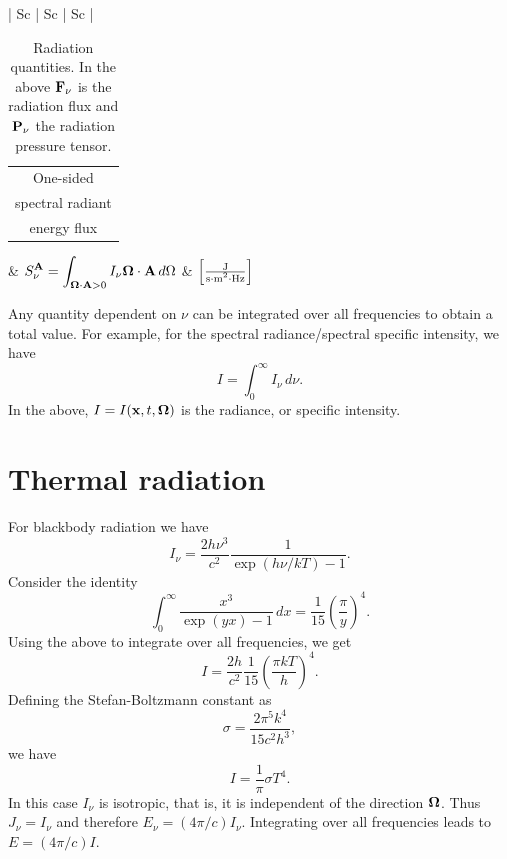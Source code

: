 \documentclass[a4paper,11pt]{article}
\begin{document}
\begin{table}[ht]
\begin{tabular} { | Sc | Sc | Sc |}
        \hline
        
        \begin{tabular}{c} One-sided \\ spectral radiant \\ energy flux \end{tabular} 
        & $ \displaystyle S_\nu^{\mathbf{A}} = \int_{\bm \Omega \cdot \mathbf{A} > 0} I_\nu \bm \Omega \cdot \mathbf{A} \, d\Omega $ 
        & $ \left [ \frac{\text{J}}{\text{s$\cdot$m\textsuperscript{2}$\cdot$Hz}} \right ]$ \\

        \hline
    \end{tabular}
    \caption{Radiation quantities. In the above $\mathbf{F}_\nu$ is the radiation flux and $\mathbf{P}_\nu$ the radiation pressure tensor.}
    \label{tab:definitions}
\end{table}

Any quantity dependent on $\nu$ can be integrated over all frequencies to obtain a total value. For example, for the spectral radiance/spectral specific intensity, we have
\begin{equation}
    I = \int_0^\infty I_\nu \, d\nu.
\end{equation}
In the above, $I = I(\mathbf{x}, t, \bm \Omega)$ is the radiance, or specific intensity. 

\section{Thermal radiation}
For blackbody radiation we have
\begin{equation}
    I_\nu = \frac{2h\nu^3}{c^2} \frac{1}{\exp(h\nu/kT) - 1}.
\end{equation}
Consider the identity 
\begin{equation}
    \int_0^\infty \frac{x^3}{\exp(yx) - 1} \, dx = \frac{1}{15} \left ( \frac{\pi}{y} \right )^4.
\end{equation}
Using the above to integrate over all frequencies, we get
\begin{equation}
    I = \frac{2h}{c^2} \frac{1}{15} \left ( \frac{ \pi kT}{h} \right )^4.
\end{equation}
Defining the Stefan-Boltzmann constant as
\begin{equation}
    \sigma = \frac{2 \pi^5 k^4}{15 c^2 h^3},
\end{equation}
we have
\begin{equation}
    I = \frac{1}{\pi} \sigma T^4.
\end{equation}
In this case $I_\nu$ is isotropic, that is, it is independent of the direction $\bm \Omega$. Thus $J_\nu = I_\nu$ and therefore $E_\nu = (4\pi/c) I_\nu$. Integrating over all frequencies leads to $E = (4\pi/c) I$.
\end{document}
